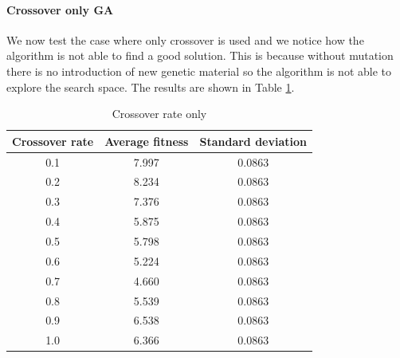 \paragraph*{Crossover only GA}
We now test the case where only crossover is used and we notice how the algorithm is not able to find a good solution. This is because without mutation there is no introduction of new genetic material so the algorithm is not able to explore the search space. The results are shown in Table \ref{tab:crossover_rate}.
\begin{table}[H]
    \centering
    \begin{tabular}{|c|c|c|}
        Crossover rate & Average fitness & Standard deviation \\ \hline
        0.1            & 7.997           & 0.0863             \\
        0.2            & 8.234           & 0.0863             \\
        0.3            & 7.376           & 0.0863             \\
        0.4            & 5.875           & 0.0863             \\
        0.5            & 5.798           & 0.0863             \\
        0.6            & 5.224           & 0.0863             \\
        0.7            & 4.660           & 0.0863             \\
        0.8            & 5.539           & 0.0863             \\
        0.9            & 6.538           & 0.0863             \\
        1.0            & 6.366           & 0.0863             \\
    \end{tabular}
    \caption{Crossover rate only}
    \label{tab:crossover_rate}
\end{table}

